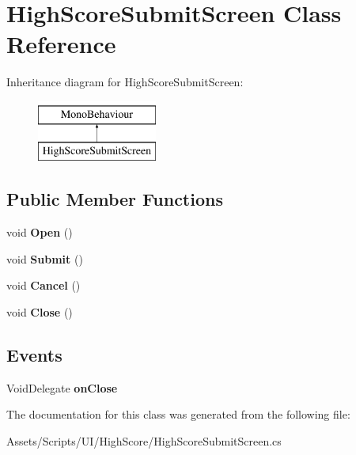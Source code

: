 \hypertarget{class_high_score_submit_screen}{}\section{High\+Score\+Submit\+Screen Class Reference}
\label{class_high_score_submit_screen}
Inheritance diagram for High\+Score\+Submit\+Screen\+:\begin{figure}[H]
\begin{center}
\leavevmode
\includegraphics[height=2.000000cm]{class_high_score_submit_screen}
\end{center}
\end{figure}
\subsection*{Public Member Functions}
\begin{DoxyCompactItemize}
\item 
void {\bfseries Open} ()\hypertarget{class_high_score_submit_screen_a84a1d2b866bc3065112fc8985c0e299b}{}\label{class_high_score_submit_screen_a84a1d2b866bc3065112fc8985c0e299b}

\item 
void {\bfseries Submit} ()\hypertarget{class_high_score_submit_screen_a16cf3514fb8efccd9db187b028ebc67b}{}\label{class_high_score_submit_screen_a16cf3514fb8efccd9db187b028ebc67b}

\item 
void {\bfseries Cancel} ()\hypertarget{class_high_score_submit_screen_ab52cea1ce0bc77c114ec680adfa38c2f}{}\label{class_high_score_submit_screen_ab52cea1ce0bc77c114ec680adfa38c2f}

\item 
void {\bfseries Close} ()\hypertarget{class_high_score_submit_screen_ad7cded8cff4486603e97288dbe9cfe85}{}\label{class_high_score_submit_screen_ad7cded8cff4486603e97288dbe9cfe85}

\end{DoxyCompactItemize}
\subsection*{Events}
\begin{DoxyCompactItemize}
\item 
Void\+Delegate {\bfseries on\+Close}\hypertarget{class_high_score_submit_screen_ac3ddf19f74ea6049a7c6d671703fee51}{}\label{class_high_score_submit_screen_ac3ddf19f74ea6049a7c6d671703fee51}

\end{DoxyCompactItemize}


The documentation for this class was generated from the following file\+:\begin{DoxyCompactItemize}
\item 
Assets/\+Scripts/\+U\+I/\+High\+Score/High\+Score\+Submit\+Screen.\+cs\end{DoxyCompactItemize}

